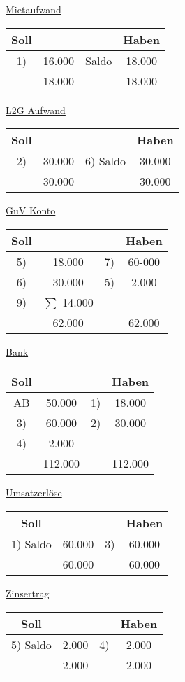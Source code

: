 \documentclass[paper=a4, fontsize=11pt]{scrartcl}
\numberwithin{equation}{section}
\numberwithin{figure}{section}
\numberwithin{table}{section}
\begin{document}
\underline{Mietaufwand}
\begin{tabular}{cc|cc}
Soll & & & Haben \\
\hline
1) & 16.000 & Saldo & 18.000 \\
\hline
 & 18.000 & & 18.000 \\
\end{tabular}

\underline{L2G Aufwand}
\begin{tabular}{cc|cc}
Soll & & & Haben \\
\hline
2) & 30.000 & 6) Saldo & 30.000 \\
\hline
& 30.000 & & 30.000 \\
\end{tabular}

\underline{GuV Konto}
\begin{tabular}{cc|cc}
Soll & & & Haben \\
\hline
5) & 18.000 & 7)  & 60-000\\
6) & 30.000 & 5) & 2.000 \\
9) & $\sum$ 14.000  & & \\
\hline
& 62.000 & & 62.000 \\
\end{tabular}

\underline{Bank}
\begin{tabular}{cc|cc}
Soll & & & Haben \\
\hline
AB & 50.000 & 1) & 18.000 \\
3) & 60.000 & 2) & 30.000 \\
4) & 2.000 & & \\
\hline
& 112.000 & & 112.000 \\
\end{tabular}

\underline{Umsatzerlöse}
\begin{tabular}{cc|cc}
Soll & & & Haben \\
\hline
1) Saldo & 60.000 & 3) & 60.000 \\
\hline
 & 60.000 & & 60.000 \\
\end{tabular}

\underline{Zinsertrag}
\begin{tabular}{cc|cc}
Soll & & & Haben \\
\hline
5) Saldo & 2.000 & 4) & 2.000 \\
\hline
& 2.000 & & 2.000 \\
\end{tabular}
\end{document}
